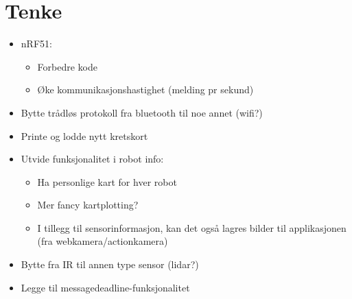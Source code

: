     \section{Tenke}
\begin{itemize}
    \item nRF51:
    \begin{itemize}
        \item Forbedre kode
        \item Øke kommunikasjonshastighet (melding pr sekund)
    \end{itemize}
    \item Bytte trådløs protokoll fra bluetooth til noe annet (wifi?)
    \item Printe og lodde nytt kretskort
    \item Utvide funksjonalitet i robot info:
    \begin{itemize}
        \item Ha personlige kart for hver robot
        \item Mer fancy kartplotting?
        \item I tillegg til sensorinformasjon, kan det også lagres bilder til applikasjonen (fra webkamera/actionkamera)
    \end{itemize}
    \item Bytte fra IR til annen type sensor (lidar?)
    \item Legge til messagedeadline-funksjonalitet
\end{itemize}